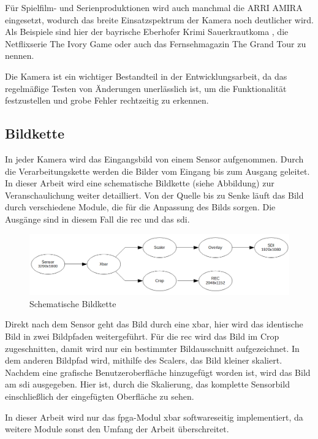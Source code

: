 Für Spielfilm- und Serienproduktionen wird auch manchmal die \ac{ARRI} AMIRA eingesetzt, wodurch das breite Einsatzspektrum der Kamera noch deutlicher wird.
Als Beispiele sind hier der bayrische Eberhofer Krimi \glqq Sauerkrautkoma\grqq{} \cite{arrikrimi}, die Netflixserie \glqq The Ivory Game\grqq{} \cite{imdbivory} oder auch das Fernsehmagazin \glqq The Grand Tour\grqq{} \cite{imdbtour} zu nennen.
 
Die Kamera ist ein wichtiger Bestandteil in der Entwicklungsarbeit, da das regelmäßige Testen von Änderungen unerlässlich ist, um die Funktionalität festzustellen und grobe Fehler rechtzeitig zu erkennen.

\subsection{Bildkette}\label{sec:bildkette}
In jeder Kamera wird das Eingangsbild von einem Sensor aufgenommen. Durch die Verarbeitungskette werden die Bilder vom Eingang bis zum Ausgang geleitet. In dieser Arbeit wird eine schematische Bildkette (siehe Abbildung) zur Veranschaulichung weiter detailliert. Von der Quelle bis zu Senke läuft das Bild durch verschiedene Module, die für die Anpassung des Bilds sorgen. Die Ausgänge sind in diesem Fall die \ac{rec} und das \ac{sdi}.

\begin{figure}[!hbtp]
	\centering
	\includegraphics[width = \linewidth]{pictures/2019-11-17_Bildkette.png}
	\smallskip
	\caption{Schematische Bildkette}
	\label{fig:bild}
\end{figure} 

Direkt nach dem Sensor geht das Bild durch eine \ac{xbar}, hier wird das identische Bild in zwei Bildpfaden weitergeführt. Für die \acl{rec} wird das Bild im Crop zugeschnitten, damit wird nur ein bestimmter Bildausschnitt aufgezeichnet. In dem anderen Bildpfad wird, mithilfe des Scalers, das Bild kleiner skaliert. Nachdem eine grafische Benutzeroberfläche hinzugefügt worden ist, wird das Bild am \ac{sdi} ausgegeben. Hier ist, durch die Skalierung, das komplette Sensorbild einschließlich der eingefügten Oberfläche zu sehen.

In dieser Arbeit wird nur das \ac{fpga}-Modul \ac{xbar} softwareseitig implementiert, da weitere Module sonst den Umfang der Arbeit überschreitet.

